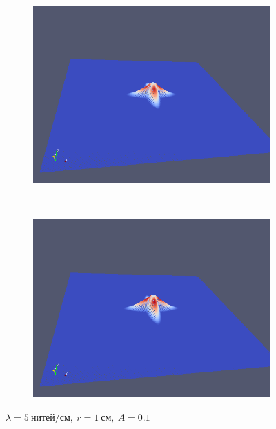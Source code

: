 \begin{figure}[H]
\begin{subfigure}[t]{0.5\textwidth}
        \includegraphics[width=\textwidth]{img/fiber/density_5_radius_1_amplitude_0.1/5.png}
    \end{subfigure}%
    ~
    \begin{subfigure}[t]{0.5\textwidth}
        \centering
        \includegraphics[width=\textwidth]{img/fiber/density_5_radius_1_amplitude_0.1/6.png}
    \end{subfigure}
    \caption{$\lambda=5~нитей/см,~r=1~см,~A=0.1$}
\end{figure}
